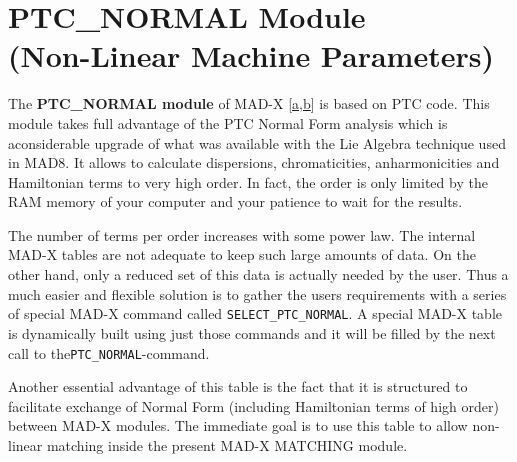 

%  
% 




\section{PTC\_NORMAL Module 
\\        (Non-Linear Machine Parameters)}

  The \textbf{PTC\_NORMAL module} of MAD-X [\hyperlink{F._Schmidt}{a},\hyperlink{d Amico}{b}] is based on PTC   code. This module takes full advantage of the PTC Normal Form analysis which is   a\nolinebreak considerable upgrade of what was available with the Lie Algebra   technique used in MAD8. It allows to calculate dispersions, chromaticities,   anharmonicities and Hamiltonian terms to very high order. In fact, the order is   only limited by the RAM memory of your computer and your patience to wait for   the results. 

  The number of terms per order increases with some power law. The internal MAD-X   tables are not adequate to keep such large amounts of data. On the other hand,   only a reduced set of this data is actually needed by the user. Thus a much   easier and flexible solution is to gather the users  requirements with a series   of special MAD-X command called \texttt{SELECT\_PTC\_NORMAL}. A   special MAD-X table is dynamically built using just those commands and it will   be filled by the next call to the\nolinebreak \texttt{PTC\_NORMAL}-command. 

  Another essential advantage of this table is the fact that it is structured to   facilitate exchange of Normal Form (including Hamiltonian terms of high order)   between MAD-X modules. The immediate goal is to use this table to allow   non-linear matching inside the present MAD-X MATCHING module.

